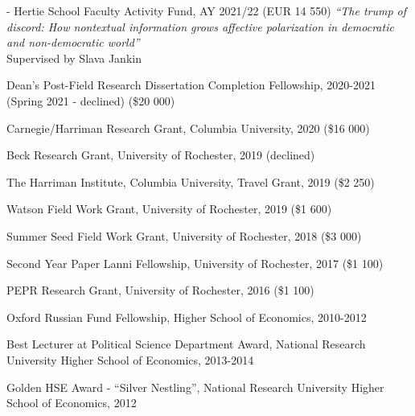 \documentclass[margin,line,10.95pt]{res}
\begin{document}
\begin{resume}
\vspace*{-3.5mm}

- Hertie School Faculty Activity Fund, AY 2021/22 (EUR 14 550) \textit{“The trump of discord: How nontextual information grows affective polarization in democratic and non-democratic world”} 
\\
Supervised by Slava Jankin
\\

\vspace*{-4.5mm}

Dean's Post-Field Research Dissertation Completion Fellowship, 2020-2021 (Spring 2021 - declined) (\$20 000)
\vspace*{-4.5mm}

Carnegie/Harriman Research Grant, Columbia University, 2020 (\$16 000)
\vspace*{-4.5mm}

Beck Research Grant, University of Rochester, 2019 (declined)
\vspace*{-4.5mm}

The Harriman Institute, Columbia University, Travel Grant, 2019 (\$2 250)
\vspace*{-4.5mm}

Watson Field Work Grant, University of Rochester, 2019 (\$1 600)
\vspace*{-4.5mm}

Summer Seed Field Work Grant, University of Rochester, 2018 (\$3 000)
\vspace*{-4.5mm}

Second Year Paper Lanni Fellowship, University of Rochester, 2017 (\$1 100)
\vspace*{-4.5mm}

PEPR Research Grant, University of Rochester, 2016 (\$1 100)
\vspace*{-4.5mm}


Oxford Russian Fund Fellowship, Higher School of Economics, 2010-2012 
\vspace*{-2.5mm}

Best Lecturer at Political Science Department Award, National Research University Higher School of Economics, 2013-2014 
\vspace*{-4.5mm}

Golden HSE Award - ``Silver Nestling'', National Research University Higher School of Economics, 2012
\vspace*{-2.5mm}



\end{resume}
\end{document}

